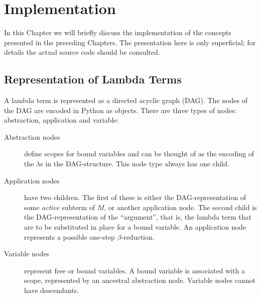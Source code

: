 
\chapter{Implementation}
\label{chap:implementation}

In this Chapter we will briefly discuss the implementation of the concepts
presented in the preceding Chapters. The presentation here is only
superficial; for details the actual source code should be consulted.

\section{Representation of Lambda Terms}

A lambda term is represented as a directed acyclic graph (DAG). The nodes of the
DAG are encoded in Python as objects. There are three types of nodes: 
abstraction, application and variable:
\begin{description}
	\item[Abstraction nodes] define scopes for bound variables and can be thought
	of as the encoding of the $\lambda$s in the DAG-structure. This node type
	always has one child.
	
	\item[Application nodes] have two children. The first of these
	is either the DAG-representation of some \emph{active} subterm of 
	$M$, or another application node. The second child is the DAG-representation
	of the ``argument'', that is, the lambda term that are to be substituted
	in place for a bound variable. An application node represents a possible
	one-step $\beta$-reduction.
	
	\item[Variable nodes] represent free or bound variables. A bound 
	variable is associated with a scope, represented by an ancestral
	abstraction node. Variable nodes cannot have descendants.
\end{description}


